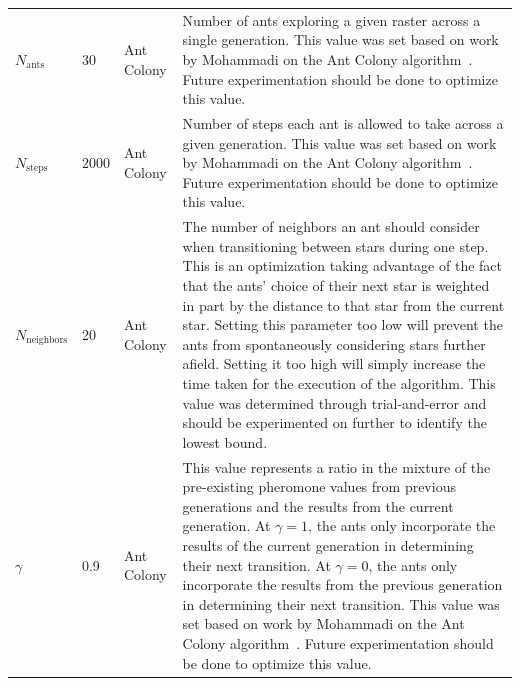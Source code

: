 \begin{table}[H]
{\begin{tabular}{l l l p{10cm}}
            $N_{\text{ants}}$              & 30    & Ant Colony & Number of ants exploring a given raster across a single generation. This  value was set based on work by Mohammadi on the Ant Colony algorithm~\cite{AntColonyMohammadi}. Future experimentation should be done to optimize this value.                                                                                                                                                                                                                                                                                                                                                            \\

            $N_{\text{steps}}$             & 2000  & Ant Colony & Number of steps each ant is allowed to take across a given generation. This value was set based on work by Mohammadi on the Ant Colony algorithm~\cite{AntColonyMohammadi}. Future experimentation should be done to optimize this value.                                                                                                                                                                                                                                                                                                                                                          \\

            $N_{\text{neighbors}}$         & 20    & Ant Colony & The number of neighbors an ant should consider when transitioning between stars during one step. This is an optimization taking advantage of the fact that the ants' choice of their next star is weighted in part by the distance to that star from the current star. Setting this parameter too low will prevent the ants from spontaneously considering stars further afield. Setting it too high will simply increase the time taken for the execution of the algorithm. This value was determined through trial-and-error and should be experimented on further to identify the lowest bound. \\

            $\gamma$                       & 0.9   & Ant Colony & This value represents a ratio in the mixture of the pre-existing pheromone values from previous generations and the results from the current generation. At $\gamma = 1$, the ants only incorporate the results of the current generation in determining their next transition. At $\gamma = 0$, the ants only incorporate the results from the previous generation in determining their next transition. This value was set based on work by Mohammadi on the Ant Colony algorithm~\cite{AntColonyMohammadi}. Future experimentation should be done to optimize this value.                       \\


\end{tabular}}
\end{table}
